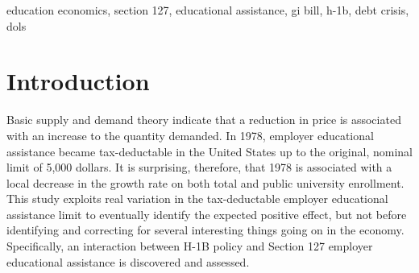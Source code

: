 \documentclass[review]{elsarticle}
\begin{document}
\begin{frontmatter}
\begin{abstract}
    
\end{abstract}

\begin{keyword}
education economics, section 127, educational assistance, gi bill, h-1b, debt crisis, dols
\MSC[2010] %
\end{keyword}

\end{frontmatter}

\pagebreak
\linenumbers
        
    \section{Introduction}

    Basic supply and demand theory indicate that a reduction in price is associated with an increase to the quantity demanded.
    In 1978, employer educational assistance became tax-deductable in the United States up to the original, nominal limit of 5,000 dollars.
    It is surprising, therefore, that 1978 is associated with a local decrease in the growth rate on both total and public university enrollment.
    This study exploits real variation in the tax-deductable employer educational assistance limit to eventually identify the expected positive effect,
    but not before identifying and correcting for several interesting things going on in the economy.
    Specifically, an interaction between H-1B policy and Section 127 employer educational assistance is discovered and assessed.
\end{document}
